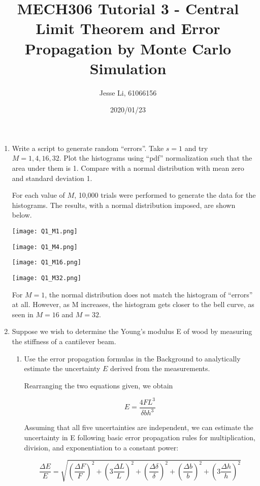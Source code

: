 \documentclass{article}
\begin{document}
\author{Jesse Li, 61066156}
\date{2020/01/23}
\title{MECH306 Tutorial 3 - Central Limit Theorem and Error Propagation by Monte Carlo Simulation}

\maketitle

\begin{enumerate}
    \item Write a script to generate random “errors”. Take \(s=1\) and try \(M = 1, 4, 16, 32\). Plot the histograms using “pdf” normalization such that the area under them is 1. Compare with a normal distribution with mean zero and standard deviation 1.


For each value of \(M\), 10,000 trials were performed to generate the data for the histograms. The results, with a normal distribution imposed, are shown below.

\texttt{[image: Q1\_M1.png]}

\texttt{[image: Q1\_M4.png]}

\texttt{[image: Q1\_M16.png]}

\texttt{[image: Q1\_M32.png]}

For \(M = 1\), the normal distribution does not match the histogram of “errors” at all. However, as M increases, the histogram gets closer to the bell curve, as seen in \(M=16\) and \(M=32\).


\item Suppose we wish to determine the Young’s modulus E of wood by measuring the stiffness of a cantilever beam.
\begin{enumerate}
    \item Use the error propagation formulas in the Background to analytically estimate the uncertainty $E$ derived from the measurements.

Rearranging the two equations given, we obtain

\[ E=\frac{4FL^3}{\delta b h^3} \]

Assuming that all five uncertainties are independent, we can estimate the uncertainty in E following basic error propagation rules for multiplication, division, and exponentiation to a constant power:

\newcommand{\reluncer}[2][]{\left( #1 \frac{\Delta #2}{#2} \right)^2 }

\begin{equation}
\frac{\Delta E}{E} = \sqrt{\reluncer{F} + \reluncer[3]{L} + \reluncer{\delta} + \reluncer{b} + \reluncer[3]{h}}
\end{equation}



\end{enumerate}
\end{enumerate}
\end{document}
